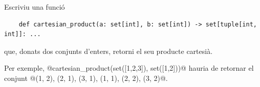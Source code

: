 
\Statement

Escriviu una funció

\lstset{language=Python}
\begin{lstlisting}
    def cartesian_product(a: set[int], b: set[int]) -> set[tuple[int, int]]: ...
\end{lstlisting}

que, donats dos conjunts d'enters, retorni el seu producte cartesià.

\medskip

Per exemple, @cartesian_product(set([1,2,3]), set([1,2]))@ hauria de retornar el conjunt @{(1, 2), (2, 1), (3, 1), (1, 1), (2, 2), (3, 2)}@.
